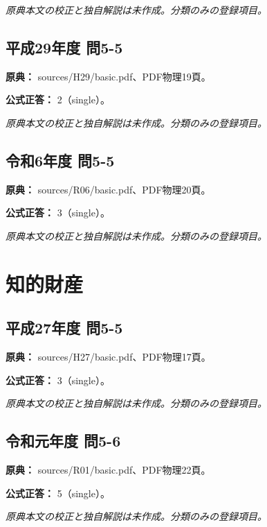 \par\textit{原典本文の校正と独自解説は未作成。分類のみの登録項目。}

\subsection{平成29年度 問5-5}
\label{q:h29-reg-basic-5-5}

\noindent\textbf{原典：} sources/H29/basic.pdf、PDF物理19頁。

\textbf{公式正答：} 2（single）。

\par\textit{原典本文の校正と独自解説は未作成。分類のみの登録項目。}

\subsection{令和6年度 問5-5}
\label{q:r06-reg-basic-5-5}

\noindent\textbf{原典：} sources/R06/basic.pdf、PDF物理20頁。

\textbf{公式正答：} 3（single）。

\par\textit{原典本文の校正と独自解説は未作成。分類のみの登録項目。}

\section{知的財産}

\subsection{平成27年度 問5-5}
\label{q:h27-reg-basic-5-5}

\noindent\textbf{原典：} sources/H27/basic.pdf、PDF物理17頁。

\textbf{公式正答：} 3（single）。

\par\textit{原典本文の校正と独自解説は未作成。分類のみの登録項目。}

\subsection{令和元年度 問5-6}
\label{q:r01-reg-basic-5-6}

\noindent\textbf{原典：} sources/R01/basic.pdf、PDF物理22頁。

\textbf{公式正答：} 5（single）。

\par\textit{原典本文の校正と独自解説は未作成。分類のみの登録項目。}

